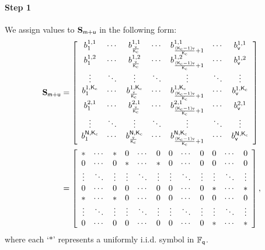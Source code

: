 \documentclass[conference,letterpaper]{IEEEtran}
\begin{document}
 

\paragraph*{Step 1}
We assign values to ${\bf S}_{{\sf m}+{\sf u}}$ in the following form:
\begin{align}
{\bf S}_{\msf+\usf}&= \left[ \begin{array}{ccccccc}
 b^{1,1}_{1}  & \cdots &  b^{1,1}_{\frac{\vsf}{\Ksf_{\rm c}}}  &\cdots & b^{1,1}_{\frac{(\Ksf_{\rm c}-1)\vsf}{\Ksf_{\rm c}}+1}& \cdots& b^{1,1}_{\vsf} \\ 
  b^{1,2}_{1}  & \cdots &  b^{1,2}_{\frac{\vsf}{\Ksf_{\rm c}}}  &\cdots & b^{1,2}_{\frac{(\Ksf_{\rm c}-1)\vsf}{\Ksf_{\rm c}}+1}& \cdots& b^{1,2}_{\vsf} \\ 
 \vdots &   \ddots&  \vdots&   \ddots& \vdots &\ddots &\vdots\\
 b^{1,\Ksf_{\rm c}}_{1} &\cdots &  b^{1,\Ksf_{\rm c}}_{\frac{\vsf}{\Ksf_{\rm c}}}  & \cdots  & b^{1,\Ksf_{\rm c}}_{\frac{(\Ksf_{\rm c}-1)\vsf}{\Ksf_{\rm c}}+1}& \cdots & b^{1,\Ksf_{\rm c}}_{\vsf} \\ 
 b^{2,1}_{1}   &\cdots &  b^{2,1}_{\frac{\vsf}{\Ksf_{\rm c}}}  & \cdots &  b^{2,1}_{\frac{(\Ksf_{\rm c}-1)\vsf}{\Ksf_{\rm c}}+1}& \cdots & b^{2,1}_{\vsf} \\  
 \vdots &   \ddots&  \vdots&   \ddots& \vdots &\ddots &\vdots\\
b^{\Nsf,\Ksf_{\rm c}}_{1}  &\cdots &  b^{\Nsf,\Ksf_{\rm c}}_{\frac{\vsf}{\Ksf_{\rm c}}}  & \cdots & b^{\Nsf,\Ksf_{\rm c}}_{\frac{(\Ksf_{\rm c}-1)\vsf}{\Ksf_{\rm c}}+1}& \cdots & b^{\Nsf,\Ksf_{\rm c}}_{\vsf}   
\end{array} \right]  \nonumber \\
&= 
\left[ \begin{array}{cccccccccccc}
* & \cdots & * & 0 &\cdots & 0  &0 & \cdots& 0& 0& \cdots& 0\\ 
0 & \cdots & 0 & * &\cdots & * &0  & \cdots& 0& 0& \cdots& 0\\ 
 \vdots &   \ddots&  \vdots&  \vdots&  \ddots&  \vdots& \vdots& \ddots&  \vdots& \vdots &\ddots &\vdots\\
0 &\cdots &  0 &0 &\cdots &0  & 0& \cdots & 0 &*& \cdots & * \\ 
*   &\cdots &  *  &0 &\cdots & 0  &0& \cdots& 0&  0& \cdots &0 \\  
 \vdots &   \ddots&  \vdots&  \vdots&  \ddots&  \vdots& \vdots& \ddots&  \vdots& \vdots &\ddots &\vdots\\
     0  &\cdots & 0 & 0 &\cdots & 0 &0 & \cdots &0 & * & \cdots & *
\end{array} \right]
,\label{eq:S_{m+u}}
\end{align}
where each `$*$' represents a uniformly i.i.d. symbol in $\mathbb{F}_{{\sf q}}$. 
\end{document}
